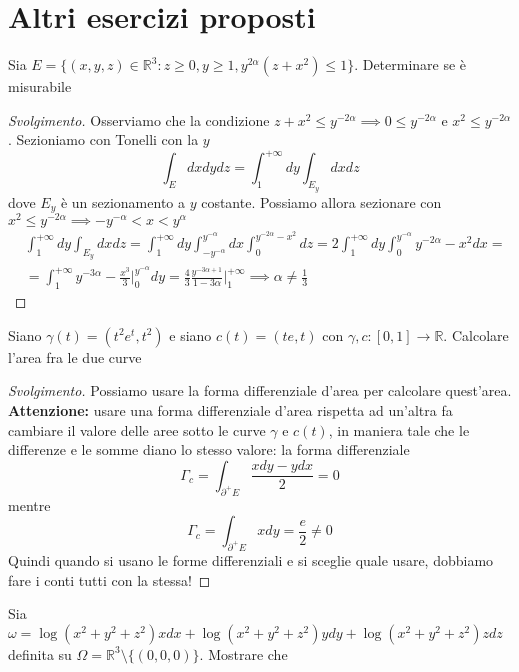 \chapter{Altri esercizi proposti}
\begin{exercise}
	Sia $E=\{(x, y, z) \in \mathbb{R}^3 : z \geq 0, y \geq 1, y^{2 \alpha}(z + x^2) \leq 1 \}$. Determinare se è misurabile
\end{exercise}
\begin{proof}[Svolgimento]
	Osserviamo che la condizione $z + x^2 \leq y^{-2 \alpha} \implies 0 \leq y^{-2\alpha}$ e $x^2 \leq y^{-2 \alpha}$. Sezioniamo con Tonelli con la $y$
	$$
	\int_E dxdydz = \int_1^{+\infty} dy \int_{E_y} dxdz
	$$
	dove $E_y$ è un sezionamento a $y$ costante. Possiamo allora sezionare con $x^2 \leq y^{-2\alpha} \implies -y^{-\alpha} < x < y^{\alpha}$
	\begin{align*}
	&\int_1^{+\infty} dy \int_{E_y} dxdz = \int_1^{+\infty} dy \int_{-y^{-\alpha}}^{y^{-\alpha}} dx \int_0^{y^{-2 \alpha} - x^2} dz = 2 \int_1^{+\infty} dy \int_0^{y^{-\alpha}} y^{-2 \alpha} - x^2 dx = \\
	&=\int_1^{+\infty} y^{-3 \alpha} - \frac{x^3}{3}\Bigg|_0^{y^{-\alpha}} dy = \frac{4}{3} \frac{y^{-3\alpha + 1}}{1 - 3 \alpha}\Bigg|_1^{+\infty} \implies \alpha \neq \frac{1}{3}
	\end{align*}
\end{proof}
\begin{exercise}
Siano $\gamma(t)=(t^2 e^t, t^2)$ e siano $c(t)=(te, t)$ con $\gamma, c:[0,1] \to \mathbb{R}$. Calcolare l'area fra le due curve
\end{exercise}
\begin{proof}[Svolgimento]
	Possiamo usare la forma differenziale d'area per calcolare quest'area. \textbf{Attenzione:} usare una forma differenziale d'area rispetta ad un'altra fa cambiare il valore delle aree sotto le curve $\gamma$ e $c(t)$, in maniera tale che le differenze e le somme diano lo stesso valore: la forma differenziale
	$$
	\Gamma_c = \int_{\partial^{+} E} \frac{xdy - ydx}{2} = 0
	$$
	mentre
	$$
	\Gamma_c = \int_{\partial^{+} E} xdy = \frac{e}{2} \neq 0
	$$
	Quindi quando si usano le forme differenziali e si sceglie quale usare, dobbiamo fare i conti tutti con la stessa!
\end{proof}
\begin{exercise}
	Sia $\omega = \log(x^2 + y^2 + z^2)xdx + \log(x^2+y^2+z^2)ydy + \log(x^2+y^2+z^2)zdz$ definita su $\Omega = \mathbb{R}^3 \setminus \{(0, 0, 0)\}$. Mostrare che 
\end{exercise}